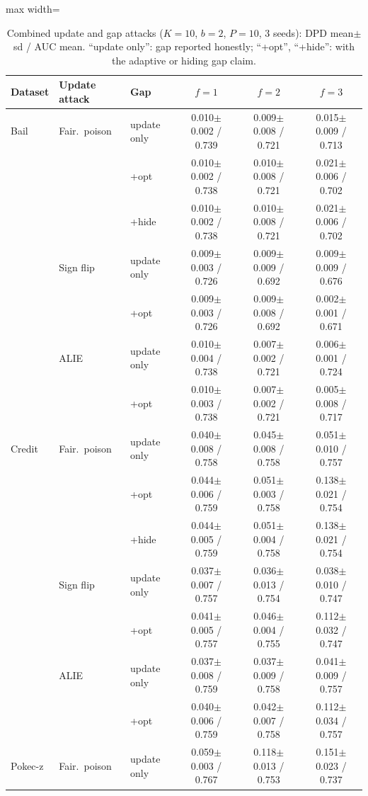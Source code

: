 \begin{table}[tbp]
\centering
\scriptsize
\setlength{\tabcolsep}{3pt}
\caption{Combined update and gap attacks ($K=10$, $b=2$, $P=10$, 3 seeds): DPD mean$\pm$sd / AUC mean. ``update only'': gap reported honestly; ``+opt'', ``+hide'': with the adaptive or hiding gap claim.}
\label{tab:s_e9}
\begin{adjustbox}{max width=\textwidth}
\begin{tabular}{lllccc}
\toprule
Dataset & Update attack & Gap & $f=1$ & $f=2$ & $f=3$ \\
\midrule
Bail & Fair.\ poison & update only & 0.010$\pm$0.002 / 0.739 & 0.009$\pm$0.008 / 0.721 & 0.015$\pm$0.009 / 0.713 \\
 &  & +opt & 0.010$\pm$0.002 / 0.738 & 0.010$\pm$0.008 / 0.721 & 0.021$\pm$0.006 / 0.702 \\
 &  & +hide & 0.010$\pm$0.002 / 0.738 & 0.010$\pm$0.008 / 0.721 & 0.021$\pm$0.006 / 0.702 \\
 & Sign flip & update only & 0.009$\pm$0.003 / 0.726 & 0.009$\pm$0.009 / 0.692 & 0.009$\pm$0.009 / 0.676 \\
 &  & +opt & 0.009$\pm$0.003 / 0.726 & 0.009$\pm$0.008 / 0.692 & 0.002$\pm$0.001 / 0.671 \\
 & ALIE & update only & 0.010$\pm$0.004 / 0.738 & 0.007$\pm$0.002 / 0.721 & 0.006$\pm$0.001 / 0.724 \\
 &  & +opt & 0.010$\pm$0.003 / 0.738 & 0.007$\pm$0.002 / 0.721 & 0.005$\pm$0.008 / 0.717 \\
\midrule
Credit & Fair.\ poison & update only & 0.040$\pm$0.008 / 0.758 & 0.045$\pm$0.008 / 0.758 & 0.051$\pm$0.010 / 0.757 \\
 &  & +opt & 0.044$\pm$0.006 / 0.759 & 0.051$\pm$0.003 / 0.758 & 0.138$\pm$0.021 / 0.754 \\
 &  & +hide & 0.044$\pm$0.005 / 0.759 & 0.051$\pm$0.004 / 0.758 & 0.138$\pm$0.021 / 0.754 \\
 & Sign flip & update only & 0.037$\pm$0.007 / 0.757 & 0.036$\pm$0.013 / 0.754 & 0.038$\pm$0.010 / 0.747 \\
 &  & +opt & 0.041$\pm$0.005 / 0.757 & 0.046$\pm$0.004 / 0.755 & 0.112$\pm$0.032 / 0.747 \\
 & ALIE & update only & 0.037$\pm$0.008 / 0.759 & 0.037$\pm$0.009 / 0.758 & 0.041$\pm$0.009 / 0.757 \\
 &  & +opt & 0.040$\pm$0.006 / 0.759 & 0.042$\pm$0.007 / 0.758 & 0.112$\pm$0.034 / 0.757 \\
\midrule
Pokec-z & Fair.\ poison & update only & 0.059$\pm$0.003 / 0.767 & 0.118$\pm$0.013 / 0.753 & 0.151$\pm$0.023 / 0.737 \\

\end{tabular}
\end{adjustbox}
\end{table}
